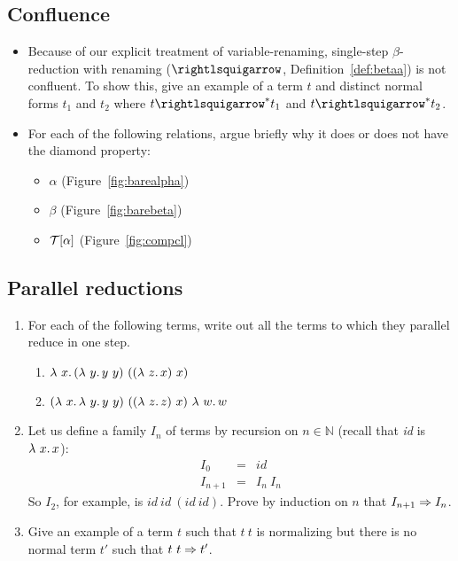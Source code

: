 \subsection{Confluence}

\begin{itemize}
  \item Because of our explicit treatment of variable-renaming, single-step $\beta$-reduction with renaming
     ($\betaa$, Definition~\ref{def:betaa}) is not
    confluent. To show this, give an example of a term $t$ and
    distinct normal forms $t_1$ and $t_2$ where $t \curva^* t_1$ and
    $t \curva^* t_2$.

  \item For each of the following relations, argue briefly why it does or does not have the diamond property:
    \begin{itemize}
    \item $\alpha$ (Figure~\ref{fig:barealpha})
    \item $\beta$ (Figure~\ref{fig:barebeta})
    \item $\mathcal{T}[\alpha]$ (Figure~\ref{fig:compcl})
    \end{itemize}
    \end{itemize}

\subsection{Parallel reductions}

\begin{enumerate}
\item For each of the following terms, write out all the terms to which they parallel reduce in one step.
  \begin{enumerate}
  \item $\lam{x}{(\lam{y}{y\ y})\ ((\lam{z}{x})\ x)}$
  \item $(\lam{x}{\lam{y}{y\ y}})\ ((\lam{z}{z})\ x)\ \lam{w}{w}$
  \end{enumerate}

\item Let us define a family $I_n$ of terms by recursion on $n\in\mathbb{N}$ (recall that \textit{id} is $\lambda\ x.\, x$):
  \[
  \begin{array}{lll}
    I_0 & = & \textit{id} \\
    I_{n+1} & = & I_n\ I_n
  \end{array}
  \]
  \noindent So $I_2$, for example, is
  $\textit{id}\ \textit{id}\ (\textit{id}\ \textit{id})$.  Prove by
  induction on $n$ that $I_{n+1} \Rightarrow I_n$.

  \item Give an example of a term $t$ such that $t\ t$ is normalizing but there is no normal term $t'$ such that $t\ t\Rightarrow t'$.

\end{enumerate}




